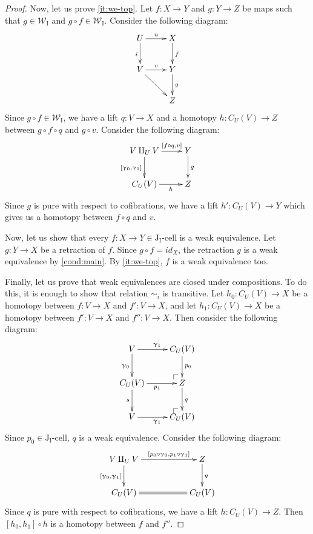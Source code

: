\documentclass{tac}
\makeatletter
\theoremstyle{definition}
\newcommand{\we}{\mathcal{W}}
\newcommand{\I}{\mathrm{I}}
\newcommand{\J}{\mathrm{J}}
\newcommand{\class}[2]{#1\text{-}\mathrm{#2}}
\newcommand{\Icell}[1][\I]{\class{#1}{cell}}
\newcommand{\Jcell}[1][]{\Icell[\J#1]}
\newcommand{\cyli}{\upgamma}
\newcommand{\po}[1][dr]{\save*!/#1+1.2pc/#1:(1,-1)@^{|-}\restore}
\makeatother
\begin{document}
\begin{proof}
Now, let us prove \eqref{it:we-top}.
Let $f : X \to Y$ and $g : Y \to Z$ be maps such that $g \in \we_\I$ and $g \circ f \in \we_\I$.
Consider the following diagram:
\[ \xymatrix{ U \ar[r]^u \ar[d]_i & X \ar[d]^f \\
              V \ar[r]^v \ar[rd]  & Y \ar[d]^g \\
                                  & Z
            } \]
Since $g \circ f \in \we_\I$, we have a lift $q : V \to X$ and a homotopy $h : C_U(V) \to Z$ between $g \circ f \circ q$ and $g \circ v$.
Consider the following diagram:
\[ \xymatrix{ V \amalg_U V \ar[r]^-{[f \circ q, v]} \ar[d]_{[\cyli_0,\cyli_1]} & Y \ar[d]^g \\
              C_U(V) \ar[r]_-h & Z
            } \]
Since $g$ is pure with respect to cofibrations, we have a lift $h' : C_U(V) \to Y$ which gives us a homotopy between $f \circ q$ and $v$.

Now, let us show that every $f : X \to Y \in \Jcell[_\I]$ is a weak equivalence.
Let $g : Y \to X$ be a retraction of $f$.
Since $g \circ f = id_X$, the retraction $g$ is a weak equivalence by \eqref{cond:main}.
By \eqref{it:we-top}, $f$ is a weak equivalence too.

Finally, let us prove that weak equivalences are closed under compositions.
To do this, it is enough to show that relation $\sim_i$ is transitive.
Let $h_0 : C_U(V) \to X$ be a homotopy between $f : V \to X$ and $f' : V \to X$, and
let $h_1 : C_U(V) \to X$ be a homotopy between $f' : V \to X$ and $f'' : V \to X$.
Then consider the following diagram:
\[ \xymatrix{ V \ar[r]^{\cyli_1} \ar[d]_{\cyli_0} & C_U(V) \ar[d]^{p_0} \\
              C_U(V) \ar[r]_{p_1} \ar[d]_s & \po Z \ar[d]^q \\
              V \ar[r]_{\cyli_1} & \po C_U(V)
            } \]
Since $p_0 \in \Jcell[_\I]$, $q$ is a weak equivalence.
Consider the following diagram:
\[ \xymatrix{ V \amalg_U V \ar[rr]^-{[p_0 \circ \cyli_0, p_1 \circ \cyli_1]} \ar[d]_{[\cyli_0,\cyli_1]} & & Z \ar[d]^q \\
              C_U(V) \ar@{=}[rr] & & C_U(V)
            } \]
Since $q$ is pure with respect to cofibrations, we have a lift $h : C_U(V) \to Z$.
Then $[h_0,h_1] \circ h$ is a homotopy between $f$ and $f''$.
\end{proof}
\end{document}
